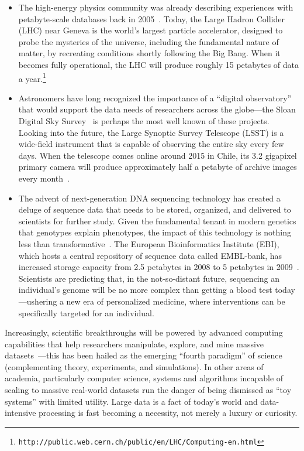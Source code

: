 \begin{itemize}

\item The high-energy physics community was already describing
  experiences with petabyte-scale databases back in
  2005~\cite{Becla_Wang_2005}.  Today, the Large Hadron Collider (LHC)
  near Geneva is the world's largest particle accelerator, designed to
  probe the mysteries of the universe, including the fundamental
  nature of matter, by recreating conditions shortly following the Big
  Bang.  When it becomes fully operational, the LHC will produce
  roughly 15 petabytes of data a year.\footnote{\texttt{http://public.web.cern.ch/public/en/LHC/Computing-en.html}}

\item Astronomers have long recognized the importance of a ``digital
  observatory'' that would support the data needs of researchers
  across the globe---the Sloan Digital Sky
  Survey~\cite{Szalay_etal_2000} is perhaps the most well known of
  these projects.  Looking into the future, the Large Synoptic Survey
  Telescope (LSST) is a wide-field instrument that is capable of
  observing the entire sky every few days.  When the telescope comes
  online around 2015 in Chile, its 3.2 gigapixel primary camera will
  produce approximately half a petabyte of archive images every
  month~\cite{Becla_etal_2006}.

\item The advent of next-generation DNA sequencing technology has
  created a deluge of sequence data that needs to be stored,
  organized, and delivered to scientists for further study.  Given the
  fundamental tenant in modern genetics that genotypes explain
  phenotypes, the impact of this technology is nothing less than
  transformative~\cite{Mardis_2008}.  The European Bioinformatics
  Institute (EBI), which hosts a central repository of sequence data
  called EMBL-bank, has increased storage capacity from 2.5 petabytes
  in 2008 to 5 petabytes in 2009~\cite{Southan_Cameron_2009}.
  Scientists are predicting that, in the not-so-distant future,
  sequencing an individual's genome will be no more complex than
  getting a blood test today---ushering a new era of personalized
  medicine, where interventions can be specifically targeted for an
  individual.

\end{itemize}

\noindent Increasingly, scientific breakthroughs will be powered by
advanced computing capabilities that help researchers manipulate,
explore, and mine massive datasets~\cite{Hey_etal_2009}---this has
been hailed as the emerging ``fourth paradigm'' of
science~\cite{Hey_etal_2009-Gray} (complementing theory, experiments,
and simulations).  In other areas of academia, particularly computer
science, systems and algorithms incapable of scaling to massive
real-world datasets run the danger of being dismissed as ``toy
systems'' with limited utility.  Large data is a fact of today's world
and data-intensive processing is fast becoming a necessity, not merely
a luxury or curiosity.

